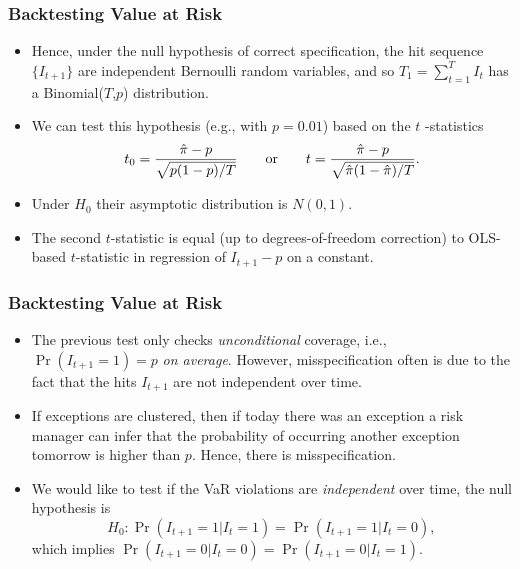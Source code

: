 \begin{frame}%

\frametitle{Backtesting Value at Risk}

\begin{itemize}
\item Hence, under the null hypothesis of correct specification, the hit
sequence $\{I_{t+1}\}$ are independent Bernoulli random variables, and so $%
T_{1}=\sum_{t=1}^{T}I_{t}$ has a Binomial($T$,$p$) distribution.

\item We can test this hypothesis (e.g., with $p=0.01$) based on the $t$%
-statistics
\begin{equation*}
t_{0}=\frac{\hat{\pi}-p}{\sqrt{p(1-p)/T}}\qquad \text{or\qquad }t=\frac{\hat{%
\pi}-p}{\sqrt{\hat{\pi}(1-\hat{\pi})/T}}.
\end{equation*}

\item Under $H_{0}$ their asymptotic distribution is $N(0,1).$

\item The second $t$-statistic is equal (up to degrees-of-freedom
correction) to OLS-based $t$-statistic in regression of $I_{t+1}-p$ on a
constant.
\end{itemize}

\end{frame}%

\begin{frame}%

\frametitle{Backtesting Value at Risk}

\begin{itemize}
\item The previous test only checks \emph{\color{red}unconditional}
coverage, i.e., $\Pr ( I_{t+1} = 1 ) =p$ \emph{\color{red}on average}.
However, misspecification often is due to the fact that the hits $I_{t+1}$
are not independent over time.

\item If exceptions are clustered, then if today there was an exception a
risk manager can infer that the probability of occurring another exception
tomorrow is higher than $p$. Hence, there is misspecification.

\item We would like to test if the VaR violations are \emph{\color{red}%
independent} over time, the null hypothesis is
\begin{equation*}
H_{0}:\Pr (I_{t+1}=1|I_{t}=1)=\Pr (I_{t+1}=1|I_{t}=0),
\end{equation*}
which implies $\Pr (I_{t+1}=0|I_{t}=0)=\Pr (I_{t+1}=0|I_{t}=1) $.
\end{itemize}

\end{frame}%

